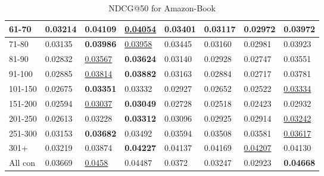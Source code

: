 \begin{table*}[]
\begin{tabular}{|l|l|l|l|l|l|l||l|}
        61-70       & 0.03214                        & \textbf{0.04109}               & \underline{0.04054}            & 0.03401                        & 0.03117                        & 0.02972                        & 0.03972                    \\ \hline
        71-80       & 0.03135                        & \textbf{0.03986}               & \underline{0.03958}            & 0.03445                        & 0.03160                        & 0.02981                        & 0.03923                    \\ \hline
        81-90       & 0.02832                        & \underline{0.03567}            & \textbf{0.03624}               & 0.03140                        & 0.02928                        & 0.02747                        & 0.03551                    \\ \hline
        91-100      & 0.02885                        & \underline{0.03814}            & \textbf{0.03882}               & 0.03163                        & 0.02884                        & 0.02717                        & 0.03781                    \\ \hline
        101-150     & 0.02675                        & \textbf{0.03351}               & 0.03332                        & 0.02927                        & 0.02652                        & 0.02522                        & \underline{0.03334}        \\ \hline
        151-200     & 0.02594                        & \underline{0.03037}            & \textbf{0.03049}               & 0.02728                        & 0.02518                        & 0.02423                        & 0.02932                    \\ \hline
        201-250     & 0.02613                        & 0.03228                        & \textbf{0.03312}               & 0.03096                        & 0.02925                        & 0.02914                        & \underline{0.03242}        \\ \hline
        251-300     & 0.03153                        & \textbf{0.03682}               & 0.03492                        & 0.03594                        & 0.03508                        & 0.03581                        & \underline{0.03617}        \\ \hline
        301+        & 0.03219                        & 0.03874                        & \textbf{0.04227}               & 0.04137                        & 0.04169                        & \underline{0.04207}            & 0.04130                    \\ \hline
        All con     & 0.03669                        & \underline{0.0458}             & 0.04487                        & 0.0372                         & 0.03247                        & 0.02923                        & \textbf{0.04668}           \\ \hline
    \end{tabular}
    \caption{NDCG@50 for Amazon-Book}
    \label{tab:amazon-book-NDCG-evaluation}
\end{table*}

